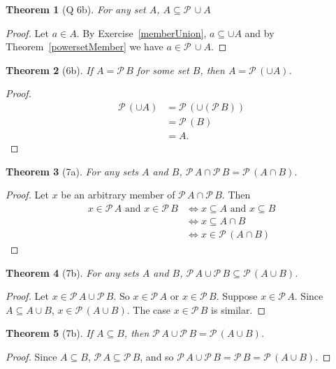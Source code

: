 \documentclass[12pt]{article}
\theoremstyle{plain}
\newtheorem*{exthm}{Theorem}
\theoremstyle{remark}
\theoremstyle{definition}
\theoremstyle{remark}
\newcommand{\powerset}{\mathscr{P}\,}
\renewcommand{\iff}{\Leftrightarrow}
\begin{document}
\begin{exthm}[Q 6b]
  For any set $A$, $A \subseteq \powerset \cup A$
\end{exthm}
\begin{proof}
  Let $a \in A$. By Exercise~\ref{memberUnion}, $a \subseteq \cup A$ and by Theorem~\ref{powersetMember} we have $a \in \powerset \cup A$.
\end{proof}

\begin{exthm}[6b]
  If $A = \powerset B$ for some set $B$, then $A = \powerset(\cup A)$.
\end{exthm}
\begin{proof}
  \begin{align*}
    \powerset(\cup A) &= \powerset(\cup (\powerset B))\\
                         &= \powerset(B)\\
                         &= A.
  \end{align*}
\end{proof}


\begin{exthm}[7a]
  For any sets $A$ and $B$, $\powerset A \cap \powerset B = \powerset (A \cap B)$.
\end{exthm}
\begin{proof}
  Let $x$ be an arbitrary member of $\powerset A \cap \powerset B$. Then
  \begin{align*}
    x \in \powerset A \text{ and } x \in \powerset B &\Leftrightarrow
    x \subseteq A \text { and } x \subseteq B\\
                                                     &\Leftrightarrow x \subseteq A \cap B\\
                                                     &\iff x \in \powerset (A \cap B)
  \end{align*}
\end{proof}

\begin{exthm}[7b]
  For any sets $A$ and $B$, $\powerset A \cup \powerset B \subseteq \powerset(A \cup B)$.
\end{exthm}
\begin{proof}
  Let $x \in \powerset A \cup \powerset B$. So $x \in \powerset A$ or $x \in \powerset B$. Suppose $x \in \powerset A$. Since $A \subseteq A \cup B$, $x \in \powerset (A \cup B)$. The case $x \in \powerset B$ is similar.
\end{proof}

\begin{exthm}[7b]
  If $A \subseteq B$, then $\powerset A \cup \powerset B = \powerset(A \cup B)$.
\end{exthm}
\begin{proof}
  Since $A \subseteq B$, $\powerset A \subseteq \powerset B$, and so $\powerset A \cup \powerset B = \powerset B = \powerset (A \cup B)$.
\end{proof}
\end{document}
